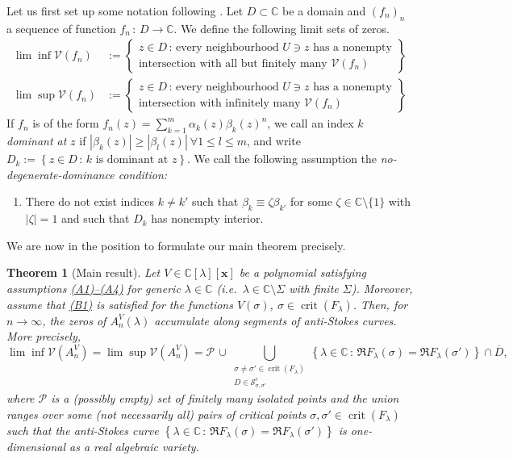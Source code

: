 \documentclass[11pt, a4paper]{article}
\newtheorem{theorem}{Theorem}
\numberwithin{theorem}{section}
\theoremstyle{remark}
\newcommand{\CC}{\mathbb{C}}
\DeclareMathOperator{\crit}{crit}
\newcommand{\V}{\mathcal{V}}
\newcommand{\cS}{\mathcal{S}}
\newcommand{\cP}{\mathcal{P}}
\renewcommand{\Re}{\mathfrak{R}}
\newcommand{\bb}[1]{\boldsymbol{#1}}
\theoremstyle{theorem}
\begin{document}
Let us first set up some notation following \cite{sokal2004chromatic}. Let $D\subset \CC$ be a domain and $(f_n)_n$ a sequence of function $f_n\,:\, D\rightarrow \CC$. We define the following limit sets of zeros.
\begin{align*}
  \lim\inf \V(f_n) & := \left\{ \begin{array}{c}
    z\in D \,:\, \text{every neighbourhood } U \ni z \text{ has a nonempty} \\
    \text{intersection with all but finitely many } \V(f_n)
  \end{array} \right\} \\
  \lim\sup \V(f_n) & := \left\{ \begin{array}{c}
    z\in D \,:\, \text{every neighbourhood } U \ni z \text{ has a nonempty} \\
    \text{intersection with infinitely many } \V(f_n)
  \end{array} \right\}
\end{align*}
If $f_n$ is of the form $f_n(z) = \sum_{k=1}^m \alpha_k(z) \beta_k(z)^n$, we call an index $k$ \emph{dominant at} $z$ if $|\beta_k(z)| \geq |\beta_l(z)| ~ \forall 1\leq l\leq m$, and write $D_k := \left\{ z\in D \,:\, k\text{ is dominant at } z \right\}$. We call the following assumption the \emph{no-degenerate-dominance condition:}
\begin{enumerate}
  \item[(B1)]  \label{ass:B1} There do not exist indices $k\neq k'$ such that $\beta_k \equiv \zeta\beta_{k'}$ for some $\zeta\in\CC \setminus \{1\}$ with $|\zeta| = 1$ and such that $D_k$ has nonempty interior.
\end{enumerate}
We are now in the position to formulate our main theorem precisely.

\begin{theorem}[Main result]
  \label{thm:main}
  Let $V \in \CC[\lambda][\bb{x}]$ be a polynomial satisfying assumptions \hyperref[ass:A1]{(A1)--(A4)} for generic $\lambda\in\CC$ (i.e.\ $\lambda\in\CC\setminus \Sigma$ with finite $\Sigma$). Moreover, assume that \hyperref[ass:B1]{(B1)} is satisfied for the functions $V(\sigma)$, $\sigma\in\crit(F_{\lambda})$. Then, for $n\to\infty$, the zeros of $A_n^V(\lambda)$ accumulate along segments of anti-Stokes curves. More precisely,
  \begin{equation}
    \label{eq:accumulation}
    \lim\inf \V(A_n^V) = \lim\sup \V(A_n^V) = \cP\, \cup \bigcup_{\substack{\sigma \neq \sigma' \in \crit(F_\lambda) \\ D \in \cS^c_{\sigma,\sigma'}}} \left\{ \lambda\in \CC \,:\, \Re F_\lambda(\sigma) = \Re F_\lambda(\sigma') \right\} \cap \overline{D},
  \end{equation}
  where $\cP$ is a (possibly empty) set of finitely many isolated points and the union ranges over some (not necessarily all) pairs of critical points $\sigma,\sigma' \in \crit(F_\lambda)$ such that the anti-Stokes curve 
  $\left\{ \lambda\in \CC \,:\, \Re F_\lambda(\sigma) = \Re F_\lambda(\sigma') \right\}$ is one-dimensional as a real algebraic variety.
\end{theorem}
\end{document}
